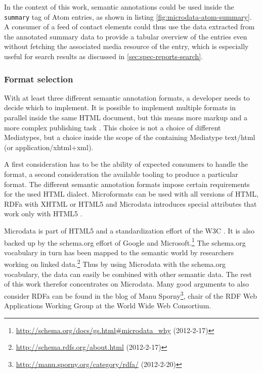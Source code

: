 \documentclass[11pt,a4paper,headsepline,twoside]{scrartcl}		%
\newcommand{\citeurl}[2]{\url{#1} (#2)}
\begin{document}
In the context of this work, semantic annotations could be used inside the
\lstinline:summary: tag of Atom entries, as shown in listing
\ref{fig:microdata-atom-summary}. A consumer of a feed of contact elements could
thus use the data extracted from the annotated summary data to provide a tabular
overview of the entries even without fetching the associated media resource of
the entry, which is especially useful for search results as discussed in
\autoref{sec:spec-reports-search}.

\subsubsection{Format selection}

With at least three different semantic annotation formats, a developer needs to
decide which to implement. It is possible to implement multiple formats in
parallel inside the same HTML document, but this means more markup and a more
complex publishing task \cite{Tennison2012}. This choice is not a choice of
different Mediatypes, but a choice inside the scope of the containing Mediatype
text/html (or application/xhtml+xml).

A first consideration has to be the ability of expected consumers to handle the
format, a second consideration the available tooling to produce a particular
format. The different semantic annotation formats impose certain requirements
for the used HTML dialect. Microformats can be used with all versions of HTML,
RDFa with XHTML or HTML5 and Microdata introduces special attributes that work
only with HTML5 \cite{Tennison2012}.

Microdata is part of HTML5 and a standardization effort of the
W3C \cite{Hickson2011}.  It is also backed up by the schema.org effort of Google
and
Microsoft.\footnote{\citeurl{http://schema.org/docs/gs.html\#microdata_why}{2012-2-17}}
The schema.org vocabulary in turn has been mapped to the semantic world by
researchers working on linked
data.\footnote{\citeurl{http://schema.rdfs.org/about.html}{2012-2-17}} Thus by
using Microdata with the schema.org vocabulary, the data can easily be combined
with other semantic data. The rest of this work therefor concentrates on
Microdata. Many good arguments to also consider RDFa can be found in the blog of
Manu
Sporny\footnote{\citeurl{http://manu.sporny.org/category/rdfa/}{2012-2-20}},
chair of the RDF Web Applications Working Group at the World Wide Web
Consortium.

\end{document}
